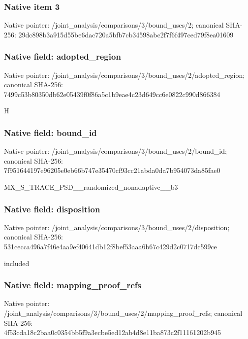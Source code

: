 \documentclass[10pt,a4paper]{article}
\begin{document}
\subsubsection{Native item 3}
Native pointer: /joint\_\allowbreak{}analysis/comparisons/3/bound\_\allowbreak{}uses/2; canonical SHA-256: 29dc898b3a915d55be6dac720a5bfb7cb34598abc2f7f6f497ced79f8ea01609

\subsubsection{Native field: adopted\_\allowbreak{}region}
Native pointer: /joint\_\allowbreak{}analysis/comparisons/3/bound\_\allowbreak{}uses/2/adopted\_\allowbreak{}region; canonical SHA-256: 7499c53b80350db62e05439f0f86a5c1b9eae4c23d649cc6e0822c990d866384

\begingroup\raggedright\sloppy H\par\endgroup

\subsubsection{Native field: bound\_\allowbreak{}id}
Native pointer: /joint\_\allowbreak{}analysis/comparisons/3/bound\_\allowbreak{}uses/2/bound\_\allowbreak{}id; canonical SHA-256: 7f951644197e96205e0eb66b747e35470cf93cc21abda0da7b954073da85fae0

\begingroup\raggedright\sloppy MX\_\allowbreak{}S\_\allowbreak{}TRACE\_\allowbreak{}PSD\_\allowbreak{}\_\allowbreak{}randomized\_\allowbreak{}nonadaptive\_\allowbreak{}\_\allowbreak{}b3\par\endgroup

\subsubsection{Native field: disposition}
Native pointer: /joint\_\allowbreak{}analysis/comparisons/3/bound\_\allowbreak{}uses/2/disposition; canonical SHA-256: 531cecca496a7f46e4aa9ef40641db12f8bef53aaa6b67c429d2c0717dc599ce

\begingroup\raggedright\sloppy included\par\endgroup

\subsubsection{Native field: mapping\_\allowbreak{}proof\_\allowbreak{}refs}
Native pointer: /joint\_\allowbreak{}analysis/comparisons/3/bound\_\allowbreak{}uses/2/mapping\_\allowbreak{}proof\_\allowbreak{}refs; canonical SHA-256: 4f53cda18c2baa0c0354bb5f9a3ecbe5ed12ab4d8e11ba873c2f11161202b945
\end{document}
